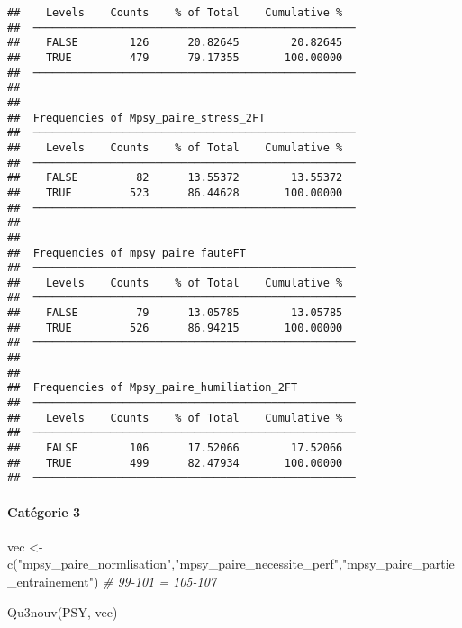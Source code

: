 \documentclass[
]{article}
\newenvironment{Shaded}{\begin{snugshade}}{\end{snugshade}}
\newcommand{\CommentTok}[1]{\textcolor[rgb]{0.56,0.35,0.01}{\textit{#1}}}
\newcommand{\FunctionTok}[1]{\textcolor[rgb]{0.00,0.00,0.00}{#1}}
\newcommand{\NormalTok}[1]{#1}
\newcommand{\OtherTok}[1]{\textcolor[rgb]{0.56,0.35,0.01}{#1}}
\newcommand{\StringTok}[1]{\textcolor[rgb]{0.31,0.60,0.02}{#1}}
\begin{document}
\begin{verbatim}
##    Levels    Counts    % of Total    Cumulative %   
##  ────────────────────────────────────────────────── 
##    FALSE        126      20.82645        20.82645   
##    TRUE         479      79.17355       100.00000   
##  ────────────────────────────────────────────────── 
## 
## 
##  Frequencies of Mpsy_paire_stress_2FT               
##  ────────────────────────────────────────────────── 
##    Levels    Counts    % of Total    Cumulative %   
##  ────────────────────────────────────────────────── 
##    FALSE         82      13.55372        13.55372   
##    TRUE         523      86.44628       100.00000   
##  ────────────────────────────────────────────────── 
## 
## 
##  Frequencies of mpsy_paire_fauteFT                  
##  ────────────────────────────────────────────────── 
##    Levels    Counts    % of Total    Cumulative %   
##  ────────────────────────────────────────────────── 
##    FALSE         79      13.05785        13.05785   
##    TRUE         526      86.94215       100.00000   
##  ────────────────────────────────────────────────── 
## 
## 
##  Frequencies of Mpsy_paire_humiliation_2FT          
##  ────────────────────────────────────────────────── 
##    Levels    Counts    % of Total    Cumulative %   
##  ────────────────────────────────────────────────── 
##    FALSE        106      17.52066        17.52066   
##    TRUE         499      82.47934       100.00000   
##  ──────────────────────────────────────────────────
\end{verbatim}

\hypertarget{catuxe9gorie-3}{%
\paragraph{Catégorie 3}\label{catuxe9gorie-3}}

\begin{Shaded}
\begin{Highlighting}[]
\NormalTok{vec }\OtherTok{\textless{}{-}} \FunctionTok{c}\NormalTok{(}\StringTok{"mpsy\_paire\_normlisation"}\NormalTok{,}\StringTok{"mpsy\_paire\_necessite\_perf"}\NormalTok{,}\StringTok{"mpsy\_paire\_partie\_entrainement"}\NormalTok{)  }\CommentTok{\# 99{-}101 = 105{-}107}

\FunctionTok{Qu3nouv}\NormalTok{(PSY, vec)}
\end{Highlighting}
\end{Shaded}
\end{document}
